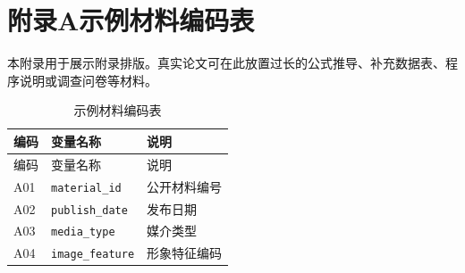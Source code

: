 \section*{附录A\quad 示例材料编码表}
{}

本附录用于展示附录排版。真实论文可在此放置过长的公式推导、补充数据表、程序说明或调查问卷等材料。

\begin{longtable}{lll}
  \caption{示例材料编码表}\\
  \toprule
  编码 & 变量名称 & 说明 \\
  \midrule
  \endfirsthead
  \toprule
  编码 & 变量名称 & 说明 \\
  \midrule
  \endhead
  A01 & \texttt{material\_id} & 公开材料编号 \\
  A02 & \texttt{publish\_date} & 发布日期 \\
  A03 & \texttt{media\_type} & 媒介类型 \\
  A04 & \texttt{image\_feature} & 形象特征编码 \\
  \bottomrule
\end{longtable}

